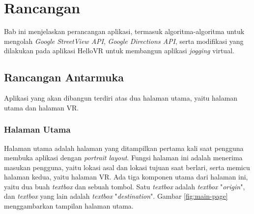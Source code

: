 \chapter{Rancangan}
\label{chap:rancangan}
Bab ini menjelaskan perancangan aplikasi, termasuk algoritma-algoritma untuk mengolah \textit{Google StreetView API}, \textit{Google Directions API}, serta modifikasi yang dilakukan pada aplikasi HelloVR untuk membangun aplikasi \textit{jogging} virtual. 


\section{Rancangan Antarmuka}
Aplikasi yang akan dibangun terdiri atas dua halaman utama, yaitu halaman utama dan halaman VR.

\subsection{Halaman Utama}
\label{subs:main-page}
Halaman utama adalah halaman yang ditampilkan pertama kali saat pengguna membuka aplikasi dengan \textit{portrait layout}. Fungsi halaman ini adalah menerima masukan pengguna, yaitu lokasi asal dan lokasi tujuan saat berlari, serta memicu halaman kedua, yaitu halaman VR. Ada tiga komponen utama dari halaman ini, yaitu dua buah \textit{textbox} dan sebuah tombol. Satu \textit{textbox} adalah \textit{textbox} "\textit{origin}", dan \textit{textbox} yang lain adalah \textit{textbox} "\textit{destination}". Gambar \ref{fig:main-page} menggambarkan tampilan halaman utama.  


